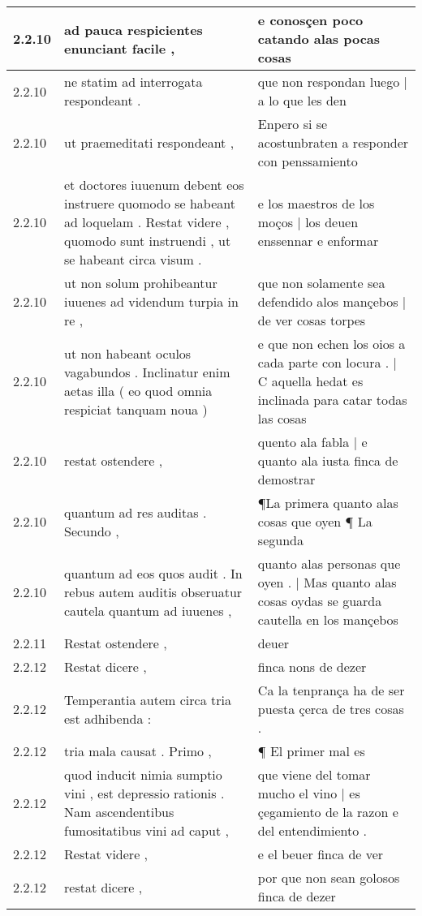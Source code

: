 \begin{tabular}{|p{1cm}|p{6.5cm}|p{6.5cm}|}
2.2.10 & ad pauca respicientes enunciant facile , & e conosçen poco catando alas pocas cosas \\\hline
2.2.10 & ne statim ad interrogata respondeant . & que non respondan luego | a lo que les den \\\hline
2.2.10 & ut praemeditati respondeant , & Enpero si se acostunbraten a responder con penssamiento \\\hline
2.2.10 & et doctores iuuenum debent eos instruere quomodo se habeant ad loquelam . Restat videre , quomodo sunt instruendi , ut se habeant circa visum . & e los maestros de los moços | los deuen enssennar e enformar \\\hline
2.2.10 & ut non solum prohibeantur iuuenes ad videndum turpia in re , & que non solamente sea defendido alos mançebos | de ver cosas torpes \\\hline
2.2.10 & ut non habeant oculos vagabundos . Inclinatur enim aetas illa ( eo quod omnia respiciat tanquam noua ) & e que non echen los oios a cada parte con locura . | C aquella hedat es inclinada para catar todas las cosas \\\hline
2.2.10 & restat ostendere , & quento ala fabla | e quanto ala iusta finca de demostrar \\\hline
2.2.10 & quantum ad res auditas . Secundo , & ¶La primera quanto alas cosas que oyen ¶ La segunda \\\hline
2.2.10 & quantum ad eos quos audit . In rebus autem auditis obseruatur cautela quantum ad iuuenes , & quanto alas personas que oyen . | Mas quanto alas cosas oydas se guarda cautella en los mançebos \\\hline
2.2.11 & Restat ostendere , & deuer \\\hline
2.2.12 & Restat dicere , & finca nons de dezer \\\hline
2.2.12 & Temperantia autem circa tria est adhibenda : & Ca la tenprança ha de ser puesta çerca de tres cosas . \\\hline
2.2.12 & tria mala causat . Primo , & ¶ El primer mal es \\\hline
2.2.12 & quod inducit nimia sumptio vini , est depressio rationis . Nam ascendentibus fumositatibus vini ad caput , & que viene del tomar mucho el vino | es çegamiento de la razon e del entendimiento . \\\hline
2.2.12 & Restat videre , & e el beuer finca de ver \\\hline
2.2.12 & restat dicere , & por que non sean golosos finca de dezer \\\hline

\end{tabular}
